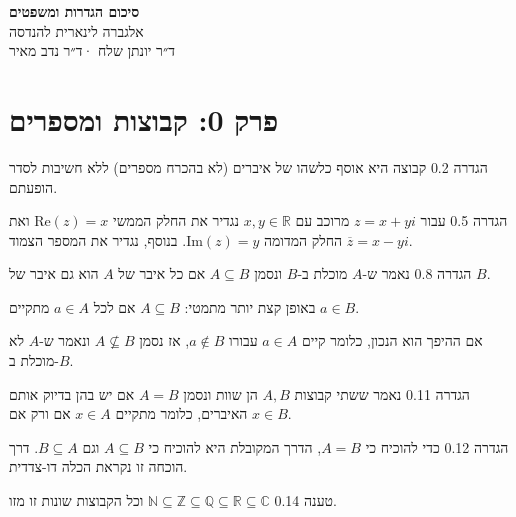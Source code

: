 \documentclass[a4paper, 11pt]{article}
\newcommand{\R}{\mathbb{R}}
\newcommand{\N}{\mathbb{N}}
\newcommand{\Z}{\mathbb{Z}}
\newcommand{\Q}{\mathbb{Q}}
\newcommand{\C}{\mathbb{C}}
\begin{document}
\setRTL

\vspace*{2cm}
\begin{center}
{\Huge\bfseries סיכום הגדרות ומשפטים}\\[14pt]
{\Large אלגברה לינארית להנדסה}\\[10pt]
{\normalsize ד״ר יונתן שלח \quad·\quad ד״ר נדב מאיר}
\end{center}
\vspace{1.5cm}

\tableofcontents
\newpage

\section{פרק 0: קבוצות ומספרים}

\begin{envbox}[defcolor]{הגדרה 0.2}
קבוצה היא אוסף כלשהו של איברים (לא בהכרח מספרים) ללא חשיבות לסדר הופעתם.
\end{envbox}

\begin{envbox}[defcolor]{הגדרה 0.5}
עבור $z=x+yi$ מרוכב עם $x,y\in\R$ נגדיר את החלק הממשי $\text{Re}(z)=x$ ואת החלק המדומה $\text{Im}(z)=y$. בנוסף, נגדיר את המספר הצמוד $\overline{z}=x-yi$.
\end{envbox}

\begin{envbox}[defcolor]{הגדרה 0.8}
נאמר ש-$A$ מוכלת ב-$B$ ונסמן $A\subseteq B$ אם כל איבר של $A$ הוא גם איבר של $B$.

באופן קצת יותר מתמטי: $A\subseteq B$ אם לכל $a\in A$ מתקיים $a\in B$. 

אם ההיפך הוא הנכון, כלומר קיים $a\in A$ עבורו $a\notin B$, אז נסמן $A\nsubseteq B$ ונאמר ש-$A$ לא מוכלת ב-$B$.
\end{envbox}

\begin{envbox}[defcolor]{הגדרה 0.11}
נאמר ששתי קבוצות $A,B$ הן שוות ונסמן $A=B$ אם יש בהן בדיוק אותם האיברים, כלומר מתקיים $x\in A$ אם ורק אם $x\in B$.
\end{envbox}

\begin{envbox}[defcolor]{הגדרה 0.12}
כדי להוכיח כי $A=B$, הדרך המקובלת היא להוכיח כי $A\subseteq B$ וגם $B\subseteq A$. דרך הוכחה זו נקראת הכלה דו-צדדית.
\end{envbox}

\begin{envbox}[thmcolor]{טענה 0.14}
$\N\subseteq\Z\subseteq\Q\subseteq\R\subseteq\C$ וכל הקבוצות שונות זו מזו.
\end{envbox}
\end{document}
